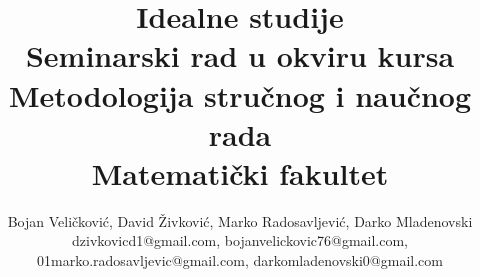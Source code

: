 \documentclass[a4paper]{article}
\begin{document}
\title{Idealne studije\\ \small{Seminarski rad u okviru kursa\\Metodologija stručnog i naučnog rada\\ Matematički fakultet}}

\author{Bojan Veličković, David Živković, Marko Radosavljević, Darko Mladenovski\\ dzivkovicd1@gmail.com, bojanvelickovic76@gmail.com, 01marko.radosavljevic@gmail.com, darkomladenovski0@gmail.com}


\maketitle

\end{document}
